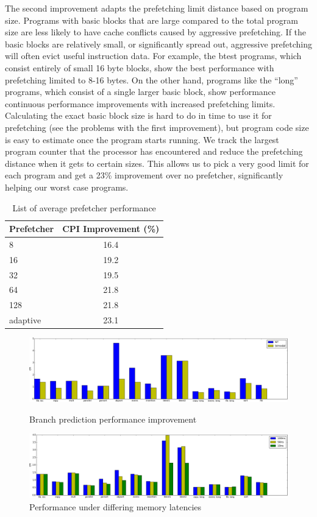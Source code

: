 \documentclass[10pt,journal,compsoc]{IEEEtran}
\begin{document}
The second improvement adapts the prefetching limit distance based on program size. Programs with basic blocks that are large compared to the total program size are less likely to have cache conflicts caused by aggressive prefetching. If the basic blocks are relatively small, or significantly spread out, aggressive prefetching will often evict useful instruction data. For example, the btest programs, which consist entirely of small 16 byte blocks, show the best performance with prefetching limited to 8-16 bytes. On the other hand, programs like the ``long'' programs, which consist of a single larger basic block, show performance continuous performance improvements with increased prefetching limits. Calculating the exact basic block size is hard to do in time to use it for prefetching (see the problems with the first improvement), but program code size is easy to estimate once the program starts running. We track the largest program counter that the processor has encountered and reduce the prefetching distance when it gets to certain sizes. This allows us to pick a very good limit for each program and get a 23\% improvement over no prefetcher, significantly helping our worst case programs. 

\begin{table}[!htb]
\centering
\begin{tabular}{l | c}
	Prefetcher & CPI Improvement (\%) \\
	\hline
	8 & 16.4 \\
	16 & 19.2\\
	32 & 19.5 \\
	64 & 21.8 \\
	128 & 21.8 \\
	adaptive & 23.1
\end{tabular}
\caption{List of average prefetcher performance}
\end{table}

\begin{figure}
\centering
\includegraphics[width=\textwidth]{branchprediction}
\caption{Branch prediction performance improvement}
\includegraphics[width=\textwidth]{memlatency}
\caption{Performance under differing memory latencies}
\end{figure}
\end{document}
